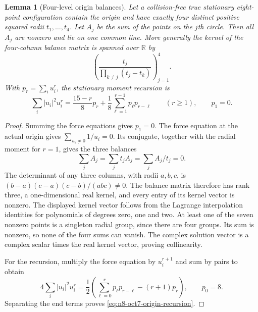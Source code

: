 \documentclass[11pt]{article}
\newtheorem{lemma}[theorem]{Lemma}
\theoremstyle{remark}
\numberwithin{equation}{section}
\begin{document}
\begin{lemma}[Four-level origin balances]
\label{lem:n8-oct7-origin-four-balances}
Let a collision-free true stationary eight-point configuration contain
the origin and have exactly four distinct positive squared radii
$t_1,\ldots,t_4$. Let $A_j$ be the sum of the points on the $j$th
circle. Then all $A_j$ are nonzero and lie on one common line.
More generally the kernel of the four-column balance matrix is
spanned over $\mathbb R$ by
\[
 \left(\frac{t_j}{\prod_{k\ne j}(t_j-t_k)}\right)_{j=1}^4.
\]
With $p_r=\sum_i u_i^r$, the stationary moment recursion is
\begin{equation}\label{eq:n8-oct7-origin-recursion}
 \sum_i|u_i|^2u_i^r
 =\frac{15-r}{8}p_r+\frac18\sum_{\ell=1}^{r-1}p_\ell p_{r-\ell}
 \qquad(r\ge1),\qquad p_1=0.
\end{equation}
\end{lemma}
\begin{proof}
Summing the force equations gives $p_1=0$. The force equation at
the actual origin gives $\sum_{u_i\ne0}1/u_i=0$. Its conjugate,
together with the radial moment for $r=1$, gives the three balances
\[
          \sum_j A_j=\sum_j t_jA_j=\sum_j A_j/t_j=0.
\]
The determinant of any three columns, with radii $a,b,c$, is
$(b-a)(c-a)(c-b)/(abc)\ne0$. The balance matrix therefore has rank
three, a one-dimensional real kernel, and every entry of its kernel
vector is nonzero. The displayed kernel vector follows from the
Lagrange interpolation identities for polynomials of degrees zero,
one and two. At least one of the seven nonzero points is a singleton
radial group, since there are four groups. Its sum is nonzero, so
none of the four sums can vanish. The complex solution vector is a
complex scalar times the real kernel vector, proving collinearity.

For the recursion, multiply the force equation by $u_i^{r+1}$ and
sum by pairs to obtain
\[
 4\sum_i|u_i|^2u_i^r
 =\frac12\left(\sum_{\ell=0}^r p_\ell p_{r-\ell}
                            -(r+1)p_r\right),\qquad p_0=8.
\]
Separating the end terms proves
\eqref{eq:n8-oct7-origin-recursion}.
\end{proof}
\end{document}
